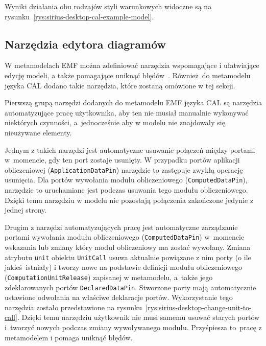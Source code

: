 Wyniki działania obu rodzajów styli warunkowych widoczne są na
rysunku~\ref{rys:sirius-desktop-cal-example-model}.

\subsection{Narzędzia edytora diagramów}

W metamodelach \gls{EMF} można zdefiniować narzędzia wspomagające i ułatwiające
edycję modeli, a także pomagające uniknąć
błędów~\cite{sirius-desktop-documentation-tools}. Również do metamodelu języka
CAL dodano takie narzędzia, które zostaną omówione w tej sekcji.

Pierwszą grupą narzędzi dodanych do metamodelu EMF języka CAL są narzędzia
automatyzujące pracę użytkownika, aby ten nie musiał manualnie wykonywać
niektórych czynności, a~jednocześnie aby w modelu nie znajdowały się nieużywane
elementy.

Jednym z takich narzędzi jest automatyczne usuwanie połączeń między portami
w~momencie, gdy ten port zostaje usunięty. W przypadku portów aplikacji
obliczeniowej (\texttt{ApplicationDataPin}) narzędzie to zastępuje zwykłą
operację usunięcia. Dla portów wywołania modułu obliczeniowego
(\texttt{ComputedDataPin}), narzędzie to uruchamiane jest podczas usuwania tego
modułu obliczeniowego. Dzięki temu narzędziu w modelu nie pozostają połączenia
zakończone jedynie z jednej strony.

Drugim z narzędzi automatyzujących pracę jest automatyczne zarządzanie
portami wywołania modułu obliczeniowego (\texttt{ComputedDataPin}) w~momencie
wskazania lub zmiany który moduł obliczeniowy ma zostać wywołany. Zmiana
atrybutu \texttt{unit} obiektu \texttt{UnitCall} usuwa aktualnie powiązane z
nim porty (o ile jakieś istniały) i tworzy nowe na podstawie definicji modułu
obliczeniowego (\texttt{ComputationUnitRelease}) zapisanej w metamodelu,
a~także jego zdeklarowanych portów \texttt{DeclaredDataPin}. Stworzone porty
mają
automatycznie ustawione odwołania na właściwe deklaracje portów.
Wykorzystanie tego narzędzia zostało przedstawione na
rysunku~\ref{rys:sirius-desktop-change-unit-to-call}.
Dzięki temu narzędziu użytkownik nie musi samemu usuwać starych portów
i~tworzyć nowych podczas zmiany wywoływanego modułu. Przyśpiesza to~pracę z
metamodelem i pomaga uniknąć błędów.


